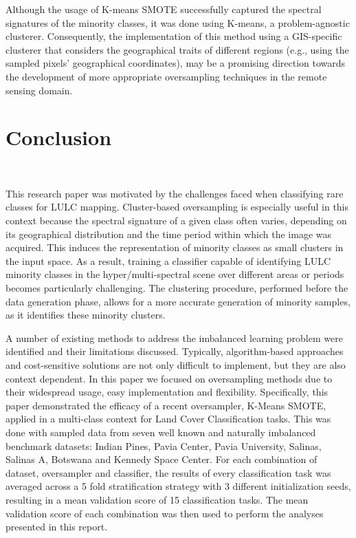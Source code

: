 \documentclass[preprint,12pt]{elsarticle}
\begin{document}
Although the usage of K-means SMOTE successfully captured the spectral
signatures of the minority classes, it was done using K-means, a
problem-agnostic clusterer. Consequently, the implementation of this method
using a GIS-specific clusterer that considers the geographical traits of
different regions (e.g., using the sampled pixels' geographical coordinates),
may be a promising direction towards the development of more appropriate
oversampling techniques in the remote sensing domain.

\section{Conclusion}~\label{sec:conclusion} 

This research paper was motivated by the challenges faced when classifying
rare classes for LULC mapping. Cluster-based oversampling is especially useful
in this context because the spectral signature of a given class often varies,
depending on its geographical distribution and the time period within which
the image was acquired. This induces the representation of minority classes as
small clusters in the input space. As a result, training a classifier capable
of identifying LULC minority classes in the hyper/multi-spectral scene over
different areas or periods becomes particularly challenging. The clustering
procedure, performed before the data generation phase, allows for a more
accurate generation of minority samples, as it identifies these minority
clusters.

A number of existing methods to address the imbalanced learning problem were
identified and their limitations discussed. Typically, algorithm-based
approaches and cost-sensitive solutions are not only difficult to implement,
but they are also context dependent. In this paper we focused on oversampling
methods due to their widespread usage, easy implementation and flexibility.
Specifically, this paper demonstrated the efficacy of a recent oversampler,
K-Means SMOTE, applied in a multi-class context for Land Cover Classification
tasks. This was done with sampled data from seven well known and naturally
imbalanced benchmark datasets: Indian Pines, Pavia Center, Pavia University,
Salinas, Salinas A, Botswana and Kennedy Space Center. For each combination of
dataset, oversampler and classifier, the results of every classification task
was averaged across a 5 fold stratification strategy with 3 different
initialization seeds, resulting in a mean validation score of 15
classification tasks. The mean validation score of each combination was then
used to perform the analyses presented in this report.
\end{document}
